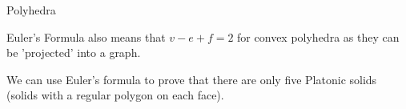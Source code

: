 \documentclass[8pt]{beamer}
\begin{document}
\begin{frame}{Polyhedra}

	Euler's Formula also means that $v-e+f=2$ for convex polyhedra as they can be 'projected' into a graph.


	We can use Euler's formula to prove that there are only five Platonic solids (solids with a regular polygon on each face).
	
\end{frame}
\end{document}

